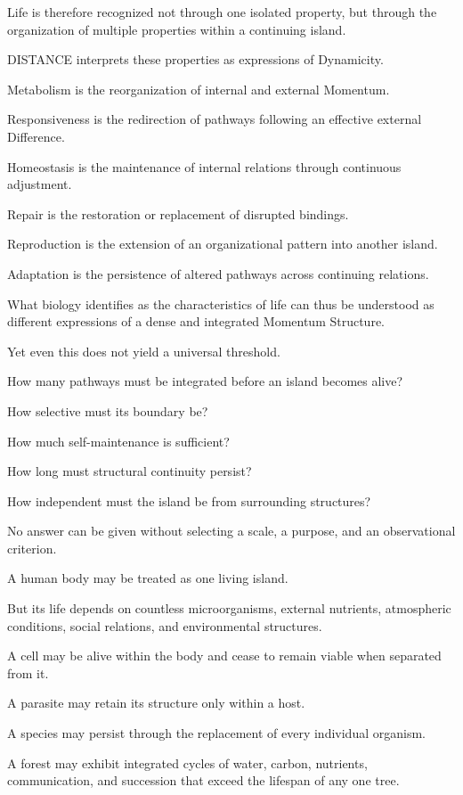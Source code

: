Life is therefore recognized not through one isolated property, but through the organization of multiple properties within a continuing island.

DISTANCE interprets these properties as expressions of Dynamicity.

Metabolism is the reorganization of internal and external Momentum.

Responsiveness is the redirection of pathways following an effective external Difference.

Homeostasis is the maintenance of internal relations through continuous adjustment.

Repair is the restoration or replacement of disrupted bindings.

Reproduction is the extension of an organizational pattern into another island.

Adaptation is the persistence of altered pathways across continuing relations.

What biology identifies as the characteristics of life can thus be understood as different expressions of a dense and integrated Momentum Structure.

Yet even this does not yield a universal threshold.

How many pathways must be integrated before an island becomes alive?

How selective must its boundary be?

How much self-maintenance is sufficient?

How long must structural continuity persist?

How independent must the island be from surrounding structures?

No answer can be given without selecting a scale, a purpose, and an observational criterion.

A human body may be treated as one living island.

But its life depends on countless microorganisms, external nutrients, atmospheric conditions, social relations, and environmental structures.

A cell may be alive within the body and cease to remain viable when separated from it.

A parasite may retain its structure only within a host.

A species may persist through the replacement of every individual organism.

A forest may exhibit integrated cycles of water, carbon, nutrients, communication, and succession that exceed the lifespan of any one tree.

